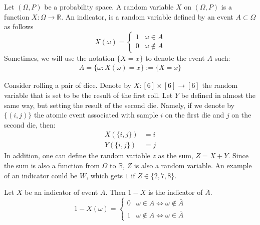\begin{definition}
  Let $(\Omega,P)$ be a probability space. A random variable $X$ on $(\Omega,P)$ is a function $X : \Omega \rightarrow \mathbb{R}$. An indicator, is a random variable defined by an event $A \subset \Omega$ as follows   
  \begin{equation*}
    X(\omega) = \begin{cases}
      1 & \omega \in A \\
      0 & \omega \notin A
    \end{cases}
  \end{equation*}
Sometimes, we will use the notation $\{ X = x \}$ to denote the event $A$ such: 
\begin{equation*}
  \begin{split}
    A = \{ \omega : X(\omega) = x \} := \{ X = x \} 
  \end{split}
\end{equation*}
\end{definition}
\begin{example} \label{example:twodic} Consider rolling a pair of dice. Denote by $X : [6]\times [6] \rightarrow [6] $ the random variable that is set to be the result of the first roll. Let $Y$ be defined in almost the same way, but setting the result of the second die. Namely, if we denote by $\{(i,j)\}$ the atomic event associated with sample $i$ on the first die and $j$ on the second die, then:
  \begin{equation*}
    \begin{split}
      X(\{i,j\}) &= i \\ 
      Y(\{i,j\}) &= j  
    \end{split}
  \end{equation*}
  In addition, one can define the random variable $z$ as the sum, $Z = X+Y$. Since the sum is also a function from $\Omega$ to $\mathbb{R}$, $Z$ is also a random variable. An example of an indicator could be $W$, which gets $1$ if $Z \in \{2, 7, 8\}$.
\end{example}


\begin{example}
  Let $X$ be an indicator of event $A$. Then $1 - X$ is the indicator of $\bar{A}$.
\begin{equation*}
   1 -  X(\omega) = \begin{cases}
     0 & \omega \in A \Leftrightarrow  \omega \notin \bar{A} \\
      1 & \omega \notin A\Leftrightarrow  \omega \in \bar{A}
    \end{cases}
  \end{equation*}

\end{example}

